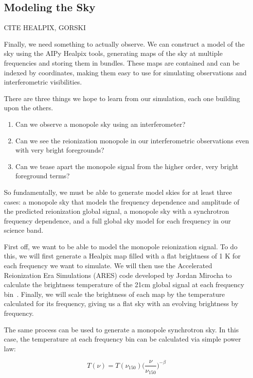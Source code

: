 \subsection{Modeling the Sky}

CITE HEALPIX, GORSKI

Finally, we need something to actually observe. We can construct a model of the 
sky using the AIPy Healpix tools, generating maps of the sky at multiple 
frequencies and storing them in bundles. These maps are contained and can be 
indexed by coordinates, making them easy to use for simulating observations and 
interferometric visibilities.

There are three things we hope to learn from our simulation, each one building 
upon the others.
\begin{enumerate}
 \item Can we observe a monopole sky using an interferometer?
 \item Can we see the reionization monopole in our interferometric observations 
  even with very bright foregrounds?
 \item Can we tease apart the monopole signal from the higher order, very 
  bright foreground terms?
\end{enumerate}

So fundamentally, we must be able to generate model skies for at least three 
cases: a monopole sky that models the frequency dependence and amplitude of the 
predicted reionization global signal, a monopole sky with a synchrotron 
frequency dependence, and a full global sky model for each frequency in our 
science band.

First off, we want to be able to model the monopole reionization signal. To do 
this, we will first generate a Healpix map filled with a flat brightness of 1 K 
for each frequency we want to simulate. We will then use the Accelerated 
Reionization Era Simulations (ARES) code developed by Jordan Mirocha to 
calculate the brightness temperature of the 21cm global signal at each 
frequency bin~\citep{mirocha2014}. Finally, we will scale the brightness of 
each map by the temperature calculated for its frequency, giving us a flat sky 
with an evolving brightness by frequency.

The same process can be used to generate a monopole synchrotron sky. In this 
case, the temperature at each frequency bin can be calculated via simple power 
law:

\begin{equation}
    \label{eq:synch-temp}
    T(\nu) = T(\nu_{150}) \Big(\frac{\nu}{\nu_{150}} \Big)^{-\beta}
\end{equation}

